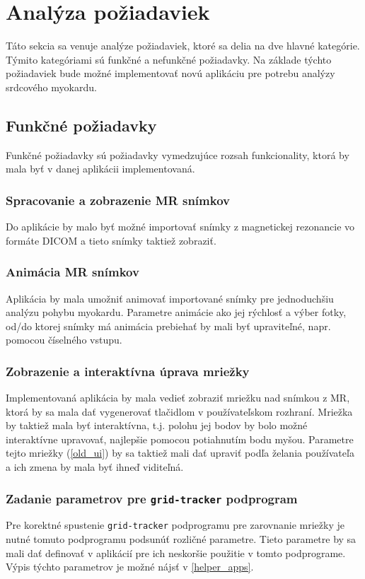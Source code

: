 {\section {Analýza požiadaviek}
Táto sekcia sa venuje analýze požiadaviek, ktoré sa delia na dve hlavné kategórie. Týmito kategóriami sú funkčné a nefunkčné požiadavky.
Na základe týchto požiadaviek bude možné implementovať novú aplikáciu pre potrebu analýzy srdcového myokardu.

\subsection {Funkčné požiadavky}
Funkčné požiadavky sú požiadavky vymedzujúce rozsah funkcionality, ktorá by mala byť v danej aplikácii implementovaná.

\subsubsection {Spracovanie a zobrazenie MR snímkov}\label{mr_images_processing}
Do aplikácie by malo byť možné importovať snímky z magnetickej rezonancie vo formáte DICOM a tieto snímky taktiež zobraziť.

\subsubsection {Animácia MR snímkov}\label{animation}
Aplikácia by mala umožniť animovať importované snímky pre jednoduchšiu analýzu pohybu myokardu. Parametre animácie ako jej rýchlosť a výber fotky, od/do ktorej snímky má animácia prebiehať by mali byť upraviteľné, napr. pomocou číselného vstupu.

\subsubsection {Zobrazenie a interaktívna úprava mriežky}\label{grid_show}
Implementovaná aplikácia by mala vedieť zobraziť mriežku nad snímkou z MR, ktorá by sa mala dať vygenerovať tlačidlom v používateľskom rozhraní. Mriežka by taktiež mala byť interaktívna, t.j. polohu jej bodov by bolo možné interaktívne upravovať, najlepšie pomocou potiahnutím bodu myšou. Parametre tejto mriežky (\ref{old_ui}) by sa taktiež mali dať upraviť podľa želania používateľa a ich zmena by mala byť ihneď viditeľná.

\subsubsection {Zadanie parametrov pre \texttt{grid-tracker} podprogram}\label{grid_paremeters}
Pre korektné spustenie \texttt{grid-tracker} podprogramu pre zarovnanie mriežky je nutné tomuto podprogramu podsunúť rozličné parametre. Tieto parametre by sa mali dať definovať v aplikácií pre ich neskoršie použitie v tomto podprograme. Výpis týchto parametrov je možné nájsť v \ref{helper_apps}.

}
